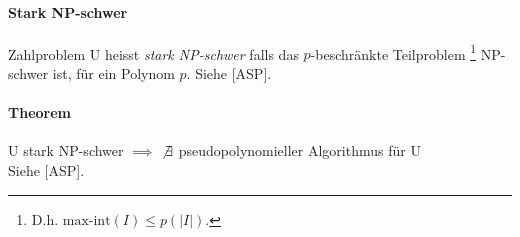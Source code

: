 \paragraph{Stark NP-schwer}
Zahlproblem U heisst \emph{stark NP-schwer} falls das $p$-beschränkte Teilproblem%
\footnote{D.h. $\text{max-int}(I) \leq p(|I|)$.} NP-schwer ist, für ein Polynom $p$.
Siehe [ASP].

\paragraph{Theorem}
U stark NP-schwer $\implies$ $\not \exists$ pseudopolynomieller Algorithmus für U\\
Siehe [ASP].
